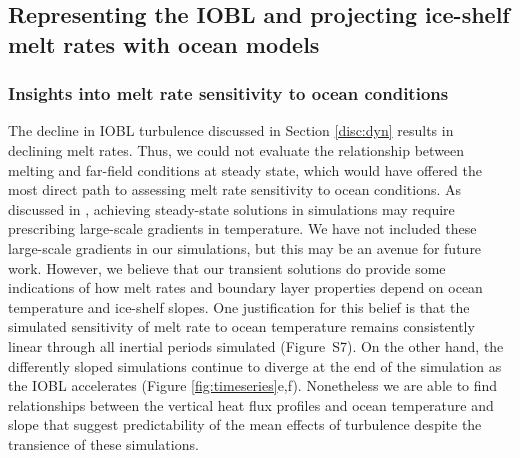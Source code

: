 \documentclass[tc, manuscript]{copernicus}
\begin{document}
\subsection{Representing the IOBL and projecting ice-shelf melt rates with ocean models}\label{disc:prm}

\subsubsection{Insights into melt rate sensitivity to ocean conditions}\label{disc:prm_sens}

The decline in IOBL turbulence discussed in Section \ref{disc:dyn} results in declining melt rates. Thus, we could not evaluate the relationship between melting and far-field conditions at steady state, which would have offered the most direct path to assessing melt rate sensitivity to ocean conditions. As discussed in \citet{jenkins_simple_2016}, achieving steady-state solutions in simulations may require prescribing large-scale gradients in temperature. We have not included these large-scale gradients in our simulations, but this may be an avenue for future work. However, we believe that our transient solutions do provide some indications of how melt rates and boundary layer properties depend on ocean temperature and ice-shelf slopes. One justification for this belief is that the simulated sensitivity of melt rate to ocean temperature remains consistently linear through all inertial periods simulated (Figure~S7). On the other hand, the differently sloped simulations continue to diverge at the end of the simulation as the IOBL accelerates (Figure \ref{fig:timeseries}e,f). Nonetheless we are able to find relationships between the vertical heat flux profiles and ocean temperature and slope that suggest predictability of the mean effects of turbulence despite the transience of these simulations.
\end{document}
